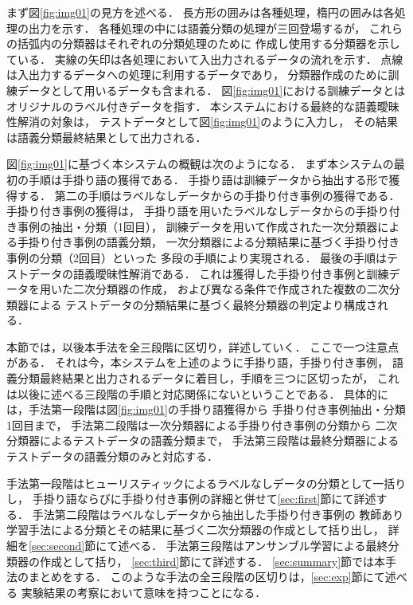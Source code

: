 \documentclass[japanese]{jnlp_1.4}
\begin{document}
まず図\ref{fig:img01}の見方を述べる．
長方形の囲みは各種処理，楕円の囲みは各処理の出力を示す．
各種処理の中には語義分類の処理が三回登場するが，
これらの括弧内の分類器はそれぞれの分類処理のために
作成し使用する分類器を示している．
実線の矢印は各処理において入出力されるデータの流れを示す．
点線は入出力するデータへの処理に利用するデータであり，
分類器作成のために訓練データとして用いるデータも含まれる．
図\ref{fig:img01}における訓練データとはオリジナルのラベル付きデータを指す．
本システムにおける最終的な語義曖昧性解消の対象は，
テストデータとして図\ref{fig:img01}のように入力し，
その結果は語義分類最終結果として出力される．

図\ref{fig:img01}に基づく本システムの概観は次のようになる．
まず本システムの最初の手順は手掛り語の獲得である．
手掛り語は訓練データから抽出する形で獲得する．
第二の手順はラベルなしデータからの手掛り付き事例の獲得である．
手掛り付き事例の獲得は，
手掛り語を用いたラベルなしデータからの手掛り付き事例の抽出・分類（1回目），
訓練データを用いて作成された一次分類器による手掛り付き事例の語義分類，
一次分類器による分類結果に基づく手掛り付き事例の分類（2回目）といった
多段の手順により実現される．
最後の手順はテストデータの語義曖昧性解消である．
これは獲得した手掛り付き事例と訓練データを用いた二次分類器の作成，
および異なる条件で作成された複数の二次分類器による
テストデータの分類結果に基づく最終分類器の判定より構成される．

本節では，以後本手法を全三段階に区切り，詳述していく．
ここで一つ注意点がある．
それは今，本システムを上述のように手掛り語，手掛り付き事例，
語義分類最終結果と出力されるデータに着目し，手順を三つに区切ったが，
これは以後に述べる三段階の手順と対応関係にないということである．
具体的には，手法第一段階は図\ref{fig:img01}の手掛り語獲得から
手掛り付き事例抽出・分類1回目まで，
手法第二段階は一次分類器による手掛り付き事例の分類から
二次分類器によるテストデータの語義分類まで，
手法第三段階は最終分類器によるテストデータの語義分類のみと対応する．

手法第一段階はヒューリスティックによるラベルなしデータの分類として一括りし，
手掛り語ならびに手掛り付き事例の詳細と併せて\ref{sec:first}節にて詳述する．
手法第二段階はラベルなしデータから抽出した手掛り付き事例の
教師あり学習手法による分類とその結果に基づく二次分類器の作成として括り出し，
詳細を\ref{sec:second}節にて述べる．
手法第三段階はアンサンブル学習による最終分類器の作成として括り，
\ref{sec:third}節にて詳述する．
\ref{sec:summary}節では本手法のまとめをする．
このような手法の全三段階の区切りは，\ref{sec:exp}節にて述べる
実験結果の考察において意味を持つことになる．
\end{document}
